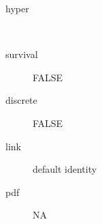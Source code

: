 \begin{description}
	\item[hyper]\ 
	\item[survival] FALSE
	\item[discrete] FALSE
	\item[link] default identity
	\item[pdf] NA
\end{description}

